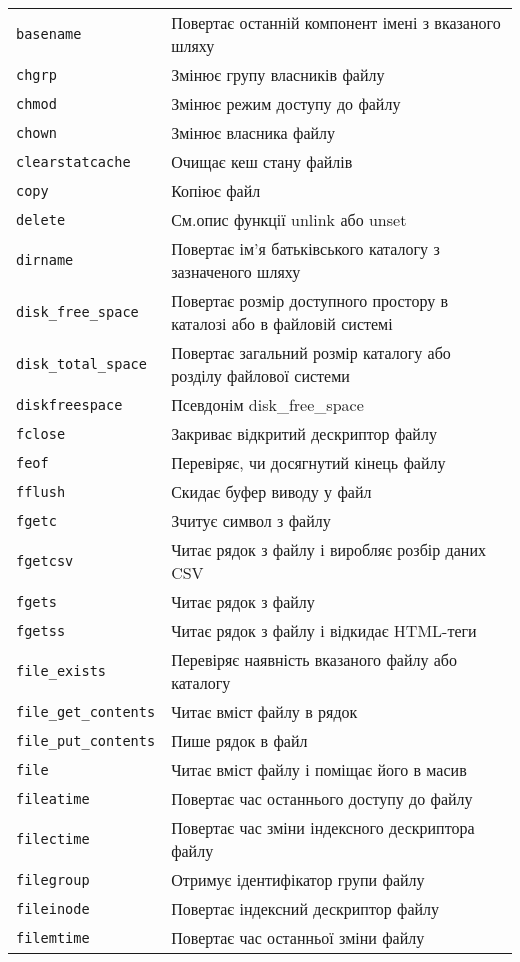 \begin{longtable}[t]{|l|p{20em}|}
\verb'basename' & Повертає останній компонент імені з вказаного шляху\\
\verb'chgrp' & Змінює групу власників файлу\\
\verb'chmod' & Змінює режим доступу до файлу\\
\verb'chown' & Змінює власника файлу\\
\verb'clearstatcache' & Очищає кеш стану файлів\\
\verb'copy' & Копіює файл\\
\verb'delete' & См.опис функції unlink або unset\\
\verb'dirname' & Повертає ім'я батьківського каталогу з зазначеного шляху\\
\verb'disk_free_space' & Повертає розмір доступного простору в каталозі або в файловій системі\\
\verb'disk_total_space' & Повертає загальний розмір каталогу або розділу файлової системи\\
\verb'diskfreespace' & Псевдонім disk\_free\_space\\
\verb'fclose' & Закриває відкритий дескриптор файлу\\
\verb'feof' & Перевіряє, чи досягнутий кінець файлу\\
\verb'fflush' & Скидає буфер виводу у файл\\
\verb'fgetc' & Зчитує символ з файлу\\
\verb'fgetcsv' & Читає рядок з файлу і виробляє розбір даних CSV\\
\verb'fgets' & Читає рядок з файлу\\
\verb'fgetss' & Читає рядок з файлу і відкидає HTML-теги\\
\verb'file_exists' & Перевіряє наявність вказаного файлу або каталогу\\
\verb'file_get_contents' & Читає вміст файлу в рядок\\
\verb'file_put_contents' & Пише рядок в файл\\
\verb'file' & Читає вміст файлу і поміщає його в масив\\
\verb'fileatime' & Повертає час останнього доступу до файлу\\
\verb'filectime' & Повертає час зміни індексного дескриптора файлу\\
\verb'filegroup' & Отримує ідентифікатор групи файлу\\
\verb'fileinode' & Повертає індексний дескриптор файлу\\
\verb'filemtime' & Повертає час останньої зміни файлу\\

\end{longtable}
